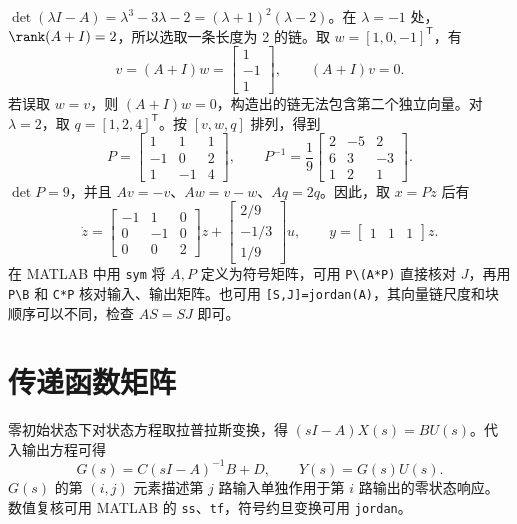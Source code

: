 \sol $\det(\lambda I-A)=\lambda^3-3\lambda-2=(\lambda+1)^2(\lambda-2)$。在 $\lambda=-1$ 处，$\rank(A+I)=2$，所以选取一条长度为 2 的链。取 $w=[1,0,-1]^{\mathsf T}$，有
\[
v=(A+I)w=\begin{bmatrix}1\\-1\\1\end{bmatrix},\qquad
(A+I)v=0 .
\]
若误取 $w=v$，则 $(A+I)w=0$，构造出的链无法包含第二个独立向量。对 $\lambda=2$，取 $q=[1,2,4]^{\mathsf T}$。按 $[v,w,q]$ 排列，得到
\[
P=\begin{bmatrix}1&1&1\\-1&0&2\\1&-1&4\end{bmatrix},\qquad
P^{-1}=\frac19\begin{bmatrix}2&-5&2\\6&3&-3\\1&2&1\end{bmatrix}.
\]
$\det P=9$，并且 $Av=-v$、$Aw=v-w$、$Aq=2q$。因此，取 $x=Pz$ 后有
\[
\dot z=\begin{bmatrix}-1&1&0\\0&-1&0\\0&0&2\end{bmatrix}z+
\begin{bmatrix}2/9\\-1/3\\1/9\end{bmatrix}u,\qquad
y=\begin{bmatrix}1&1&1\end{bmatrix}z.
\]
在 MATLAB 中用 \texttt{sym} 将 $A,P$ 定义为符号矩阵，可用 \verb|P\(A*P)| 直接核对 $J$，再用 \verb|P\B| 和 \verb|C*P| 核对输入、输出矩阵。也可用 \verb|[S,J]=jordan(A)|，其向量链尺度和块顺序可以不同，检查 $AS=SJ$ 即可。

\section{传递函数矩阵}

零初始状态下对状态方程取拉普拉斯变换，得 $(sI-A)X(s)=BU(s)$。代入输出方程可得
\[
G(s)=C(sI-A)^{-1}B+D,\qquad Y(s)=G(s)U(s).
\]
$G(s)$ 的第 $(i,j)$ 元素描述第 $j$ 路输入单独作用于第 $i$ 路输出的零状态响应。数值复核可用 MATLAB 的 \texttt{ss}、\texttt{tf}，符号约旦变换可用 \texttt{jordan}。



